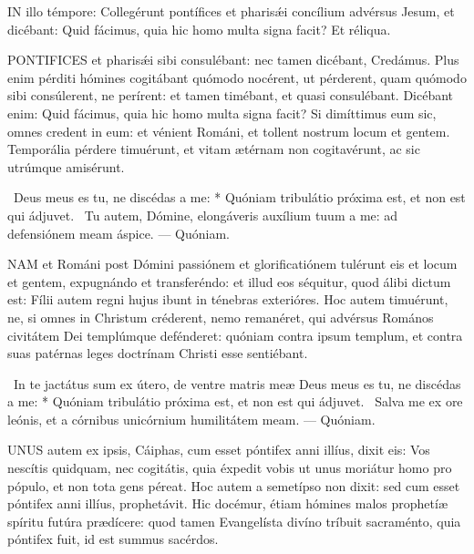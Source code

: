 \sectionornament




\lettrine[lines=2]{I}{N} illo témpore: Collegérunt pontífices et pharisǽi concílium advérsus Jesum, et dicébant: Quid fácimus, quia hic homo multa signa facit? Et réliqua.



\lettrine[lines=2]{P}{ONTIFICES} et pharisǽi sibi consulébant: nec tamen dicébant, Credámus. Plus enim pérditi hómines cogitábant quómodo nocérent, ut pérderent, quam quómodo sibi consúlerent, ne perírent: et tamen timébant, et quasi consulébant. Dicébant enim: Quid fácimus, quia hic homo multa signa facit? Si dimíttimus eum sic, omnes credent in eum: et vénient Románi, et tollent nostrum locum et gentem. Temporália pérdere timuérunt, et vitam ætérnam non cogitavérunt, ac sic utrúmque amisérunt.

\R\ Deus meus es tu, ne discédas a me: * Quóniam tribulátio próxima est, et non est qui ádjuvet. \V\ Tu autem, Dómine, elongáveris auxílium tuum a me: ad defensiónem meam áspice. --- Quóniam.


\lettrine[lines=2]{N}{AM} et Románi post Dómini passiónem et glorificatiónem tulérunt eis et locum et gentem, expugnándo et transferéndo: et illud eos séquitur, quod álibi dictum est: Fílii autem regni hujus ibunt in ténebras exterióres. Hoc autem timuérunt, ne, si omnes in Christum créderent, nemo remanéret, qui advérsus Romános civitátem Dei templúmque defénderet: quóniam contra ipsum templum, et contra suas patérnas leges doctrínam Christi esse sentiébant.

\R\ In te jactátus sum ex útero, de ventre matris meæ Deus meus es tu, ne discédas a me: * Quóniam tribulátio próxima est, et non est qui ádjuvet. \V\ Salva me ex ore leónis, et a córnibus unicórnium humilitátem meam. --- Quóniam.


\lettrine[lines=2]{U}{NUS} autem ex ipsis, Cáiphas, cum esset póntifex anni illíus, dixit eis: Vos nescítis quidquam, nec cogitátis, quia éxpedit vobis ut unus moriátur homo pro pópulo, et non tota gens péreat. Hoc autem a semetípso non dixit: sed cum esset póntifex anni illíus, prophetávit. Hic docémur, étiam hómines malos prophetíæ spíritu futúra prædícere: quod tamen Evangelísta divíno tríbuit sacraménto, quia póntifex fuit, id est summus sacérdos.

